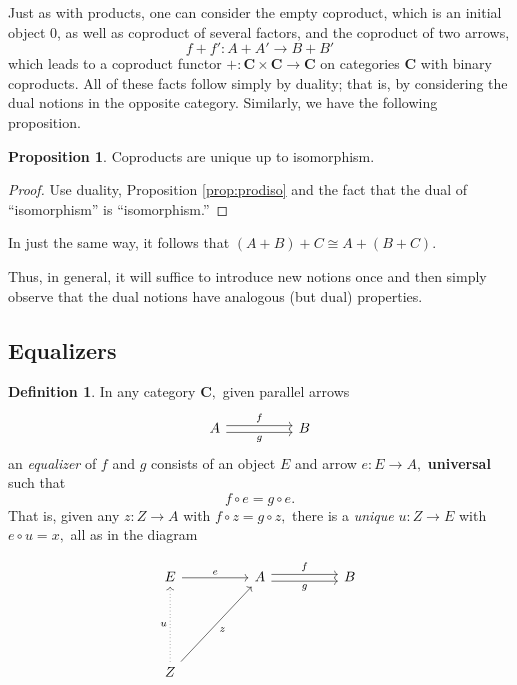 \documentclass[11pt,leqno,landscape,semhelv]{seminar}
\theoremstyle{definition}
\newtheorem{prop}[thm]{Proposition}
\newtheorem{defn}[thm]{Definition}
\numberwithin{joke}{section}
\numberwithin{thm}{section}
\numberwithin{equation}{section}
\begin{document}
Just as with products, one can consider the empty coproduct, which is an initial object $0$, as well as coproduct of several factors, and the coproduct of two arrows,
\begin{equation*} 
  f + f' : A + A' \to B + B'
\end{equation*}
which leads to a coproduct functor $+ : \mathbf{C} \times \mathbf{C} \to \mathbf{C}$ on categories $\mathbf{C}$ with binary coproducts. All of these facts follow simply by duality; that is, by considering the dual notions in the opposite category. Similarly, we have the following proposition.
\begin{prop}
  Coproducts are unique up to isomorphism.
\end{prop}
\begin{proof} 
  Use duality, Proposition \ref{prop:prodiso} and the fact that the dual of ``isomorphism'' is ``isomorphism.''
\end{proof}
In just the same way, it follows that $(A + B) + C \cong A + (B + C).$

Thus, in general, it will suffice to introduce new notions once and then simply observe that the dual notions have analogous (but dual) properties.

\subsection{Equalizers}
\begin{defn} 
  In any category $\mathbf{C},$ given parallel arrows
  \begin{equation*} 
    \begin{tikzcd}
      A \arrow[rr, "g"', shift right] \arrow[rr, "f", shift left]&&B
    \end{tikzcd}
  \end{equation*}
  an \emph{equalizer} of $f$ and $g$ consists of an object $E$ and arrow $e:E\to A,$ \textbf{universal} such that
  \begin{equation*} 
    f\circ e = g \circ e.
  \end{equation*}
  That is, given any $z : Z \to A$ with $f \circ z = g \circ z,$ there is a \emph{unique} $u:Z \to E$ with $e \circ u = x,$ all as in the diagram

  \begin{equation*} 
    \begin{tikzcd}
    E \arrow[rr, "e"] &  & A \arrow[rr, "g"', shift right] \arrow[rr, "f", shift left]&&B\\
    &&&&\\&&&&\\
    Z \arrow[rruuu, "z"'] \arrow[uuu, "u", dotted] &&&&  
    \end{tikzcd}
  \end{equation*}
\end{defn}
\end{document}
